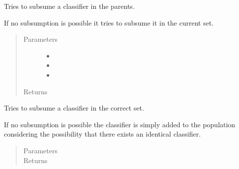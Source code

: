 \documentclass[letterpaper,10pt,english]{sphinxmanual}
\begin{document}
\begin{fulllineitems}
\begin{fulllineitems}
\label{\detokenize{eLCS:eLCS.ClassifierSet.ClassifierSet.subsumeClassifier}}
Tries to subsume a classifier in the parents.

If no subsumption is possible it tries to subsume it in the current set.
\begin{quote}\begin{description}
\item[{Parameters}] \leavevmode\begin{itemize}
\item {} 
 \textendash{} 

\item {} 
 \textendash{} 

\item {} 
 \textendash{} 

\end{itemize}

\item[{Returns}] \leavevmode


\end{description}\end{quote}

\end{fulllineitems}


\begin{fulllineitems}
\label{\detokenize{eLCS:eLCS.ClassifierSet.ClassifierSet.subsumeClassifier2}}
Tries to subsume a classifier in the correct set.

If no subsumption is possible the classifier is simply added to the population considering the
possibility that there exists an identical classifier.
\begin{quote}\begin{description}
\item[{Parameters}] \leavevmode
{} \textendash{} 

\item[{Returns}] \leavevmode


\end{description}\end{quote}


\end{fulllineitems}
\end{fulllineitems}
\end{document}

